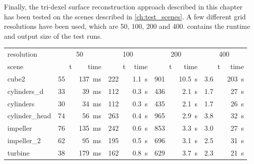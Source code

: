 Finally, the tri-dexel surface reconstruction approach described in this chapter has been tested on the scenes described in \cref{ch:test_scenes}.
A few different grid resolutions have been used, which are 50, 100, 200 and 400.
 contains the runtime and output size of the test runs.
%
\begin{table}
	\begin{subtable}{\textwidth}
		\centering
		\begin{tabular}{l|rr|rr|rr|rr}
			resolution     & \multicolumn{2}{c}{50} & \multicolumn{2}{c}{100} & \multicolumn{2}{c}{200} & \multicolumn{2}{c}{400} \\
			scene          & t\sub{out} & time & t\sub{out} & time & t\sub{out} & time & t\sub{out} & time \\
			\midrule
			cube2          & \SI{55}{\kilo\nothing} & \SI{137}{\milli\second} & \SI{222}{\kilo\nothing} & \SI{1.1}{\second} & \SI{901}{\kilo\nothing} & \SI{10.5}{\second} & \SI{3.6}{\mega\nothing} & \SI{203}{\second} \\
			cylinders\_d   & \SI{33}{\kilo\nothing} & \SI{ 39}{\milli\second} & \SI{112}{\kilo\nothing} & \SI{0.3}{\second} & \SI{436}{\kilo\nothing} & \SI{ 2.1}{\second} & \SI{1.7}{\mega\nothing} & \SI{ 27}{\second} \\
			cylinders      & \SI{30}{\kilo\nothing} & \SI{ 34}{\milli\second} & \SI{112}{\kilo\nothing} & \SI{0.3}{\second} & \SI{435}{\kilo\nothing} & \SI{ 2.1}{\second} & \SI{1.7}{\mega\nothing} & \SI{ 26}{\second} \\
			cylinder\_head & \SI{74}{\kilo\nothing} & \SI{ 56}{\milli\second} & \SI{263}{\kilo\nothing} & \SI{0.4}{\second} & \SI{965}{\kilo\nothing} & \SI{ 2.9}{\second} & \SI{3.8}{\mega\nothing} & \SI{ 32}{\second} \\
			impeller       & \SI{76}{\kilo\nothing} & \SI{135}{\milli\second} & \SI{242}{\kilo\nothing} & \SI{0.6}{\second} & \SI{853}{\kilo\nothing} & \SI{ 3.3}{\second} & \SI{3.0}{\mega\nothing} & \SI{ 27}{\second} \\
			impeller\_2    & \SI{62}{\kilo\nothing} & \SI{ 95}{\milli\second} & \SI{195}{\kilo\nothing} & \SI{0.5}{\second} & \SI{696}{\kilo\nothing} & \SI{ 3.1}{\second} & \SI{2.5}{\mega\nothing} & \SI{ 31}{\second} \\
			turbine        & \SI{38}{\kilo\nothing} & \SI{179}{\milli\second} & \SI{162}{\kilo\nothing} & \SI{0.8}{\second} & \SI{629}{\kilo\nothing} & \SI{ 3.7}{\second} & \SI{2.3}{\mega\nothing} & \SI{ 21}{\second} \\
		\end{tabular}

\end{subtable}
\end{table}
